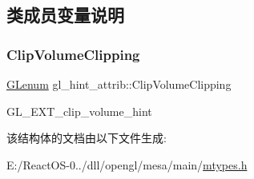 \subsection{类成员变量说明}
\mbox{\label{structgl__hint__attrib_ab4b448936c591004af1a9e116af498b0}} 
\subsubsection{\texorpdfstring{Clip\+Volume\+Clipping}{ClipVolumeClipping}}
{\footnotesize\ttfamily \hyperlink{interfacevoid}{G\+Lenum} gl\+\_\+hint\+\_\+attrib\+::\+Clip\+Volume\+Clipping}

G\+L\+\_\+\+E\+X\+T\+\_\+clip\+\_\+volume\+\_\+hint 

该结构体的文档由以下文件生成\+:\begin{DoxyCompactItemize}
\item 
E\+:/\+React\+O\+S-\/0../dll/opengl/mesa/main/\hyperlink{mtypes_8h}{mtypes.\+h}\end{DoxyCompactItemize}
